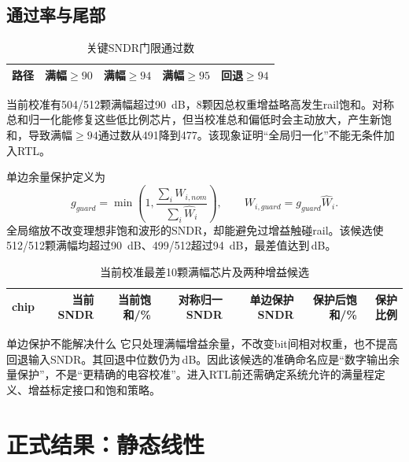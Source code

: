 \documentclass[11pt,a4paper,UTF8,fontset=none,openany]{ctexrep}
\numberwithin{equation}{chapter}
\numberwithin{figure}{chapter}
\numberwithin{table}{chapter}
\begin{document}
\section{通过率与尾部}

\begin{table}[htbp]
\centering\small
\caption{关键SNDR门限通过数}
\begin{tabular}{lrrrr}
\toprule
路径 & 满幅$\ge90$ & 满幅$\ge94$ & 满幅$\ge95$ & 回退$\ge94$ \\
\midrule

\end{tabular}
\end{table}

当前校准有504/512颗满幅超过\SI{90}{dB}，8颗因总权重增益略高发生rail饱和。对称总和归一化能修复这些低比例芯片，但当校准总和偏低时会主动放大，产生新饱和，导致满幅$\ge94$通过数从491降到477。该现象证明“全局归一化”不能无条件加入RTL。

单边余量保护定义为
\begin{equation}
g_{guard}=\min\left(1,\frac{\sum_i W_{i,nom}}{\sum_i\widehat{W}_i}\right),
\qquad W_{i,guard}=g_{guard}\widehat{W}_i.
\end{equation}
全局缩放不改变理想非饱和波形的SNDR，却能避免过增益触碰rail。该候选使512/512颗满幅均超过\SI{90}{dB}、499/512超过\SI{94}{dB}，最差值达到\GuardFullMinimum\,dB。

\begin{landscape}
\begin{table}[p]
\centering\scriptsize
\caption{当前校准最差10颗满幅芯片及两种增益候选}
\begin{tabular}{rrrrrrr}
\toprule
chip & 当前SNDR & 当前饱和/\% & 对称归一SNDR & 单边保护SNDR & 保护后饱和/\% & 保护比例 \\
\midrule

\end{tabular}
\end{table}
\end{landscape}

\begin{diagnosticbox}{单边保护不能解决什么}
它只处理满幅增益余量，不改变bit间相对权重，也不提高回退输入SNDR。其回退中位数仍为\CurrentBackoffMedian\,dB。因此该候选的准确命名应是“数字输出余量保护”，不是“更精确的电容校准”。进入RTL前还需确定系统允许的满量程定义、增益标定接口和饱和策略。
\end{diagnosticbox}

\chapter{正式结果：静态线性}
\end{document}
